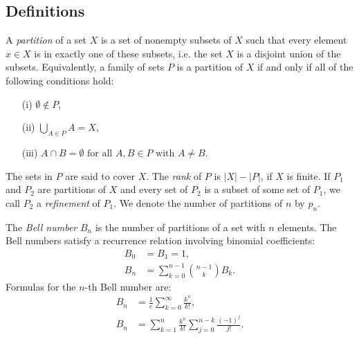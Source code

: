 \begin{appendices}
	\setcounter{table}{0}
	\renewcommand{\thetable}{B\arabic{table}}
	\captionsetup[figure]{list=no}
	\captionsetup[table]{list=no}
	
	\section{Definitions}
	\label{app:def}
	
	\begin{definition}[Partition]
		\label{def:partition}
		A \textit{partition} of a set $X$ is a set of nonempty subsets of $X$ such that every element $x \in X$ is in exactly one of these subsets, i.e. the set $X$ is a disjoint union of the subsets. Equivalently, a family of sets $P$ is a partition of $X$ if and only if all of the following conditions hold:
		\begin{itemize}
			\item[(i)] $\emptyset \notin P$,
			\item[(ii)] $\bigcup _{A\in P} A = X$, 
			\item[(iii)] $A \cap B = \emptyset \text{ for all } A, B \in P \text{ with } A \neq B$.
		\end{itemize}
		The sets in $P$ are said to cover $X$. The \textit{rank} of $P$ is $|X| - |P|$, if $X$ is finite. If $P_1$ and $P_2$ are partitions of $X$ and every set of $P_2$ is a subset of some set of $P_1$, we call $P_2$ a \textit{refinement} of $P_1$. We denote the number of partitions of $n$ by $p_n$.
	\end{definition}
	
	\begin{definition}
		\label{def:bellnumber}
		The \textit{Bell number} $B_n$ is the number of partitions of a set with $n$ elements. The Bell numbers satisfy a recurrence relation involving binomial coefficients:
		\begin{align*}
		B_0 &= B_1 = 1,\\
		B_{n} &= \sum_{k=0}^{n-1} \binom{n-1}{k} B_k.
		\end{align*}
		Formulas for the $n$-th Bell number are:
		\begin{align*}
		B_n &= \frac{1}{e} \sum_{k=0}^\infty \frac{k^n}{k!},\\
		B_n &= \sum_{k=1}^n \frac{k^n}{k!} \sum_{j=0}^{n-k} \frac{(-1)^j}{j!}.
		\end{align*}
	\end{definition}
\end{appendices}